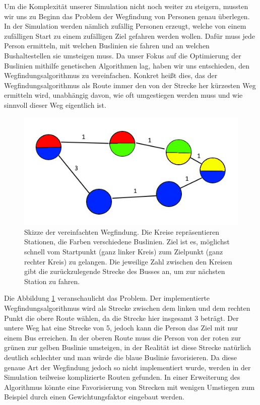 \documentclass[a4paper, 11pt]{scrartcl}
\begin{document}
Um die Komplexität unserer Simulation nicht noch weiter zu steigern, mussten wir uns zu Beginn das Problem der Wegfindung von Personen genau überlegen. In der Simulation werden nämlich zufällig Personen erzeugt, welche von einem zufälligen Start zu einem zufälligen Ziel gefahren werden wollen. Dafür muss jede Person ermitteln, mit welchen Buslinien sie fahren und an welchen Bushaltestellen sie umsteigen muss. Da unser Fokus auf die Optimierung der Buslinien mithilfe genetischen Algorithmen lag, haben wir uns entschieden, den Wegfindungsalgorithmus zu vereinfachen.
Konkret heißt dies, das der Wegfindungsalgorithmus als Route immer den von der Strecke her kürzesten Weg ermitteln wird, unabhängig davon, wie oft umgestiegen werden muss und wie sinnvoll dieser Weg eigentlich ist.

\begin{figure}[H]
    \centering
    \includegraphics[width=0.7\linewidth]{images/pathfind.jpg}
    \caption{Skizze der vereinfachten Wegfindung. Die Kreise repräsentieren Stationen, die Farben verschiedene Buslinien. Ziel ist es, möglichst schnell vom Startpunkt (ganz linker Kreis) zum Zielpunkt (ganz rechter Kreis) zu gelangen. Die jeweilige Zahl zwischen den Kreisen gibt die zurückzulegende Strecke des Busses an, um zur nächsten Station zu fahren.}  \label{fig:pathfindexample}
\end{figure}

Die Abbildung \ref{fig:pathfindexample} veranschaulicht das Problem. Der implementierte Wegfindungsalgorithmus wird als Strecke zwischen dem linken und dem rechten Punkt die obere Route wählen, da die Strecke hier insgesamt 3 beträgt. Der untere Weg hat eine Strecke von 5, jedoch kann die Person das Ziel mit nur einem Bus erreichen. In der oberen Route muss die Person von der roten zur grünen zur gelben Buslinie umsteigen, in der Realität ist diese Strecke natürlich deutlich schlechter und man würde die blaue Buslinie favorisieren. Da diese genaue Art der Wegfindung jedoch so nicht implementiert wurde, werden in der Simulation teilweise komplizierte Routen gefunden. In einer Erweiterung des Algorithmus könnte eine Favorisierung von Strecken mit wenigen Umstiegen zum Beispiel durch einen Gewichtungsfaktor eingebaut werden.\\
\end{document}
